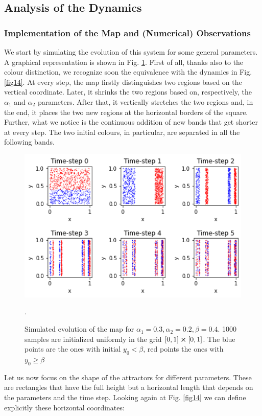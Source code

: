 \documentclass[11pt,titlepage]{article}
\begin{document}
\subsection{Analysis of the Dynamics}
\subsubsection{Implementation of the Map and (Numerical) Observations} \label{implementation_of_the_map_and}
We start by simulating the evolution of this system for some general parameters. A graphical representation is shown in Fig. \ref{fig15}. First of all, thanks also to the colour distinction, we recognize soon the equivalence with the dynamics in Fig. \ref{fig14}. At every step, the map firstly distinguishes two regions based on the vertical coordinate. Later, it shrinks the two regions based on, respectively, the $\alpha_1$ and $\alpha_2$ parameters. After that, it vertically stretches the two regions and, in the end, it places the two new regions at the horizontal borders of the square. Further, what we notice is the continuous addition of new bands that get shorter at every step. The two initial colours, in particular, are separated in all the following bands.
\begin{center}
	\begin{figure} [h]
		\centering
		\includegraphics[width = 5in]{./figures/ex3_1.png}
		\caption{Simulated evolution of the map for $\alpha_1=0.3, \alpha_2=0.2, \beta=0.4$. 1000 samples are initialized uniformly in the grid $[0,1]\cross [0,1]$. The blue points are the ones with initial $y_0<\beta$, red points the ones with $y_0\ge\beta$}.
		\label{fig15}
	\end{figure}
\end{center}
Let us now focus on the shape of the attractors for different parameters. These are rectangles that have the full height but a horizontal length that depends on the parameters and the time step. Looking again at Fig. \ref{fig14} we can define explicitly these horizontal coordinates:
\end{document}
